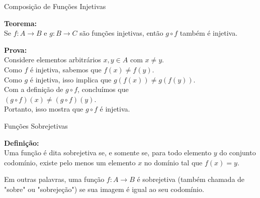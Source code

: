 \begin{frame}{Composição de Funções Injetivas}

  \textbf{Teorema:} \\
  Se \( f : A \rightarrow B \) e \( g : B \rightarrow C \) são funções injetivas, então \( g \circ f \) também é injetiva.
  
  \textbf{Prova:} \\
  Considere elementos arbitrários \( x, y \in A \) com \( x \neq y \). \\
  Como \( f \) é injetiva, sabemos que \( f(x) \neq f(y) \). \\
  Como \( g \) é injetiva, isso implica que \( g(f(x)) \neq g(f(y)) \). \\
  Com a definição de \( g \circ f \), concluímos que \\
  \( (g \circ f)(x) \neq (g \circ f)(y) \). \\
  Portanto, isso mostra que \( g \circ f \) é injetiva.
  
  \end{frame}
  

\begin{frame}{Funções Sobrejetivas}

  \textbf{Definição:} \\
  Uma função é dita sobrejetiva se, e somente se, para todo elemento \( y \) do conjunto codomínio, existe pelo menos um elemento \( x \) no domínio tal que \( f(x) = y \).
  
  Em outras palavras, uma função \( f : A \rightarrow B \) é sobrejetiva (também chamada de "sobre" ou "sobrejeção") se sua imagem é igual ao seu codomínio.
  
  \end{frame}


